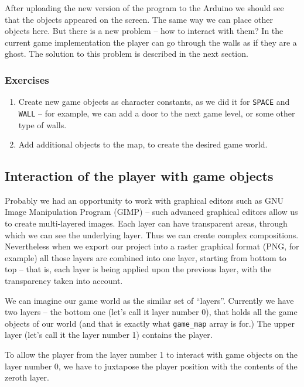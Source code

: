 \documentclass[../sparc.tex]{subfiles}
\begin{document}
After uploading the new version of the program to the Arduino we should see that
the objects appeared on the screen.  The same way we can place other objects
here.  But there is a new problem -- how to interact with them?  In the current
game implementation the player can go through the walls as if they are a ghost.
The solution to this problem is described in the next section.

\subsubsection{Exercises}
\begin{enumerate}
\item Create new game objects as character constants, as we did it for
  \texttt{SPACE} and \texttt{WALL} -- for example, we can add a
  door to the next game level, or some other type of walls.
\item Add additional objects to the map, to create the desired game world.
\end{enumerate}

\subsection{Interaction of the player with game objects}

Probably we had an opportunity to work with graphical editors such as GNU Image
Manipulation Program (GIMP) -- such advanced graphical editors allow us to create
multi-layered images.  Each layer can have transparent areas, through which we
can see the underlying layer.  Thus we can create complex compositions.
Nevertheless when we export our project into a raster graphical format (PNG, for
example) all those layers are combined into one layer, starting from bottom to
top -- that is, each layer is being applied upon the previous layer, with the
transparency taken into account.

We can imagine our game world as the similar set of ``layers''.  Currently we
have two layers -- the bottom one (let's call it layer number 0), that holds all
the game objects of our world (and that is exactly what
\texttt{game_map} array is for.)  The upper layer (let's call it the
layer number 1) contains the player.

To allow the player from the layer number 1 to interact with game objects on the
layer number 0, we have to juxtapose the player position with the contents of
the zeroth layer.
\end{document}
